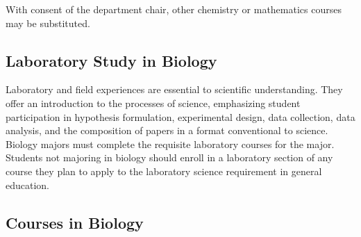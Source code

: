 \documentclass[
  letterpaper,
]{scrbook}
\begin{document}
With consent of the department chair, other chemistry or mathematics
courses may be substituted.

\subsection{Laboratory Study in
Biology}\label{laboratory-study-in-biology}

Laboratory and field experiences are essential to scientific
understanding. They offer an introduction to the processes of science,
emphasizing student participation in hypothesis formulation,
experimental design, data collection, data analysis, and the composition
of papers in a format conventional to science. Biology majors must
complete the requisite laboratory courses for the major. Students not
majoring in biology should enroll in a laboratory section of any course
they plan to apply to the laboratory science requirement in general
education.

\subsection{Courses in Biology}\label{courses-in-biology}
\end{document}
